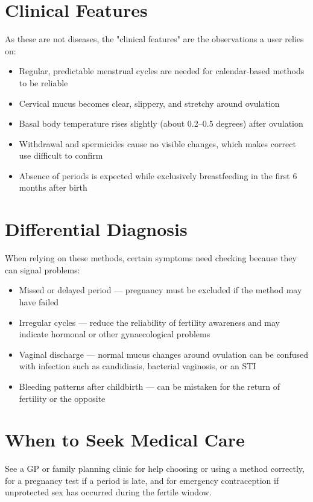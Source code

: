 \section*{Clinical Features}
As these are not diseases, the "clinical features" are the observations a user relies on:
\begin{itemize}
    \item Regular, predictable menstrual cycles are needed for calendar-based methods to be reliable
    \item Cervical mucus becomes clear, slippery, and stretchy around ovulation
    \item Basal body temperature rises slightly (about 0.2--0.5 degrees) after ovulation
    \item Withdrawal and spermicides cause no visible changes, which makes correct use difficult to confirm
    \item Absence of periods is expected while exclusively breastfeeding in the first 6 months after birth
\end{itemize}

\section*{Differential Diagnosis}
When relying on these methods, certain symptoms need checking because they can signal problems:
\begin{itemize}
    \item Missed or delayed period --- pregnancy must be excluded if the method may have failed
    \item Irregular cycles --- reduce the reliability of fertility awareness and may indicate hormonal or other gynaecological problems
    \item Vaginal discharge --- normal mucus changes around ovulation can be confused with infection such as candidiasis, bacterial vaginosis, or an STI
    \item Bleeding patterns after childbirth --- can be mistaken for the return of fertility or the opposite
\end{itemize}

\section*{When to Seek Medical Care}
See a GP or family planning clinic for help choosing or using a method correctly, for a pregnancy test if a period is late, and for emergency contraception if unprotected sex has occurred during the fertile window.

